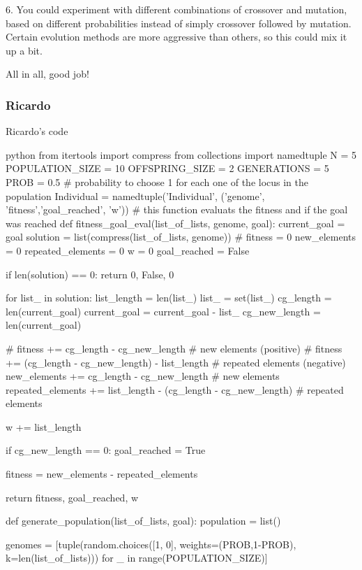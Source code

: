 6. You could experiment with different combinations of crossover and mutation, based on different probabilities instead of simply crossover followed by mutation. Certain evolution methods are more aggressive than others, so this could mix it up a bit.

All in all, good job!

\subsubsection{Ricardo}

Ricardo's code

\begin{mintedbox}{python}
  from itertools import compress
  from collections import namedtuple
  N = 5
  POPULATION_SIZE = 10
  OFFSPRING_SIZE = 2
  GENERATIONS = 5
  PROB = 0.5 # probability to choose 1 for each one of the locus in the population
  Individual = namedtuple('Individual', ('genome', 'fitness','goal_reached', 'w'))
  # this function evaluats the fitness and if the goal was reached
  def fitness_goal_eval(list_of_lists, genome, goal):
      current_goal = goal
      solution = list(compress(list_of_lists, genome))
      # fitness = 0
      new_elements = 0
      repeated_elements = 0
      w = 0
      goal_reached = False

      if len(solution) == 0:
          return 0, False, 0

      for list_ in solution:
          list_length = len(list_)
          list_ = set(list_)
          cg_length = len(current_goal)
          current_goal = current_goal - list_
          cg_new_length = len(current_goal)

          # fitness += cg_length - cg_new_length   # new elements (positive)
          # fitness += (cg_length - cg_new_length) - list_length # repeated elements (negative)
          new_elements += cg_length - cg_new_length   # new elements
          repeated_elements += list_length - (cg_length - cg_new_length) # repeated elements

          w += list_length

      if cg_new_length == 0:
          goal_reached = True

      fitness = new_elements - repeated_elements

      return fitness, goal_reached, w


  def generate_population(list_of_lists, goal):
      population = list()

      genomes = [tuple(random.choices([1, 0], weights=(PROB,1-PROB), k=len(list_of_lists))) for _ in range(POPULATION_SIZE)]


\end{mintedbox}
